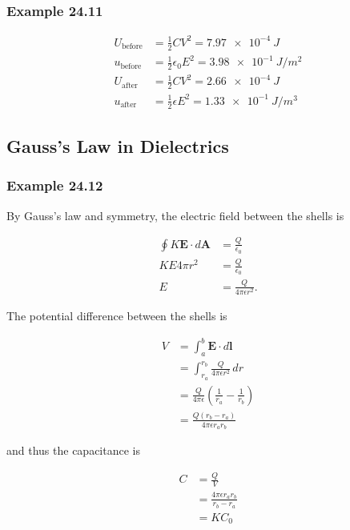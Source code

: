 \documentclass{article}
\begin{document}
\subsubsection{Example 24.11}

\begin{align*}
  U_\textrm{before} & = \frac{1}{2} C V^2 = \qty{7.97e-4}{J}              \\
  u_\textrm{before} & = \frac{1}{2} \epsilon_0 E^2 = \qty{3.98e-1}{J/m^2} \\
  U_\textrm{after}  & = \frac{1}{2} C V^2 = \qty{2.66e-4}{J}              \\
  u_\textrm{after}  & = \frac{1}{2} \epsilon E^2 = \qty{1.33e-1}{J/m^3}
\end{align*}

\subsection{Gauss's Law in Dielectrics}

\subsubsection{Example 24.12}

By Gauss's law and symmetry, the electric field between the shells is

\begin{align*}
  \oint K \mathbf{E} \cdot d\mathbf{A} & = \frac{Q}{\epsilon_0}          \\
  K E 4 \pi r^2                        & = \frac{Q}{\epsilon_0}          \\
  E                                    & = \frac{Q}{4 \pi \epsilon r^2}.
\end{align*}

The potential difference between the shells is

\begin{align*}
  V & = \int_a^b \mathbf{E} \cdot d\mathbf{l}                                 \\
    & = \int_{r_a}^{r_b} \frac{Q}{4 \pi \epsilon r^2} \,dr                    \\
    & = \frac{Q}{4 \pi \epsilon} \left( \frac{1}{r_a} - \frac{1}{r_b} \right) \\
    & = \frac{Q (r_b - r_a)}{4 \pi \epsilon r_a r_b}
\end{align*}

and thus the capacitance is

\begin{align*}
  C & = \frac{Q}{V}                              \\
    & = \frac{4 \pi \epsilon r_a r_b}{r_b - r_a} \\
    & = K C_0
\end{align*}
\end{document}
